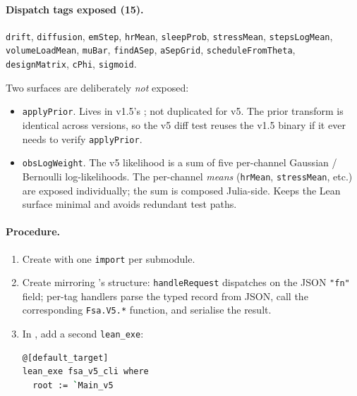 \documentclass[11pt,a4paper]{article}
\begin{document}
\paragraph{Dispatch tags exposed (15).} \texttt{drift}, \texttt{diffusion},
\texttt{emStep}, \texttt{hrMean}, \texttt{sleepProb},
\texttt{stressMean}, \texttt{stepsLogMean},
\texttt{volumeLoadMean}, \texttt{muBar}, \texttt{findASep},
\texttt{aSepGrid}, \texttt{scheduleFromTheta},
\texttt{designMatrix}, \texttt{cPhi}, \texttt{sigmoid}.

Two surfaces are deliberately \emph{not} exposed:

\begin{itemize}[itemsep=2pt]
  \item \texttt{applyPrior}. Lives in v1.5's
        ; not duplicated for v5.
        The prior transform is identical across versions, so the
        v5 diff test reuses the v1.5 binary if it ever needs to
        verify \texttt{applyPrior}.
  \item \texttt{obsLogWeight}. The v5 likelihood is a sum of five
        per-channel Gaussian / Bernoulli log-likelihoods. The
        per-channel \emph{means} (\texttt{hrMean},
        \texttt{stressMean}, etc.) are exposed individually; the
        sum is composed Julia-side. Keeps the Lean surface minimal
        and avoids redundant test paths.
\end{itemize}

\paragraph{Procedure.}

\begin{enumerate}[itemsep=2pt]
  \item Create  with one \texttt{import} per submodule.
  \item Create  mirroring 's
        structure: \texttt{handleRequest} dispatches on the JSON
        \texttt{"fn"} field; per-tag handlers parse the typed
        record from JSON, call the corresponding
        \texttt{Fsa.V5.*} function, and serialise the result.
  \item In , add a second \texttt{lean\_exe}:
\begin{lstlisting}[language=bash]
@[default_target]
lean_exe fsa_v5_cli where
  root := `Main_v5
\end{lstlisting}
\end{enumerate}
\end{document}
